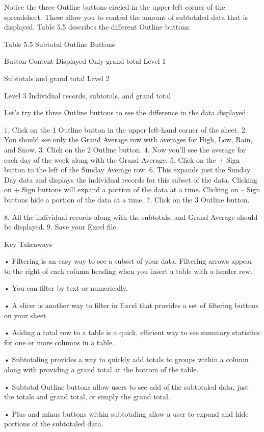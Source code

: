 Notice the three Outline buttons circled in the upper-left corner of the spreadsheet. These allow you
to control the amount of subtotaled data that is displayed. Table 5.5 describes the different Outline
buttons.

Table 5.5 Subtotal Outline Buttons

Button Content Displayed
Only grand total
Level 1


Subtotals and grand total
Level 2


Level 3 Individual records, subtotals, and grand total


Let’s try the three Outline buttons to see the difference in the data displayed:

1. Click on the 1 Outline button in the upper left-hand corner of the sheet.
2. You should see only the Grand Average row with averages for High, Low, Rain, and Snow.
3. Click on the 2 Outline button.
4. Now you’ll see the average for each day of the week along with the Grand Average.
5. Click on the + Sign button to the left of the Sunday Average row.
6. This expands just the Sunday Day data and displays the individual records for this subset of the
data. Clicking on + Sign buttons will expand a portion of the data at a time. Clicking on – Sign
buttons hide a portion of the data at a time.
7. Click on the 3 Outline button.

8. All the individual records along with the subtotals, and Grand Average should be displayed.
9. Save your Excel file.


Key Takeaways


• Filtering is an easy way to see a subset of your data. Filtering arrows appear to the right of each column
heading when you insert a table with a header row.

• You can filter by text or numerically.

• A slicer is another way to filter in Excel that provides a set of filtering buttons on your sheet.

• Adding a total row to a table is a quick, efficient way to see summary statistics for one or more columns in a
table.

• Subtotaling provides a way to quickly add totals to groups within a column along with providing a grand total
at the bottom of the table.

• Subtotal Outline buttons allow users to see add of the subtotaled data, just the totals and grand total, or
simply the grand total.

• Plus and minus buttons within subtotaling allow a user to expand and hide portions of the subtotaled data.



